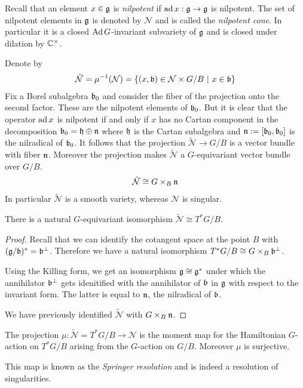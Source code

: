 \documentclass[12pt]{article}
\begin{document}
Recall that an element $x\in \mathfrak{g}$ is \emph{nilpotent} if $\operatorname{ad} x: \mathfrak{g} \to \mathfrak{g}$ is nilpotent. The set of nilpotent elements in $\mathfrak{g}$ is denoted by $\mathcal{N}$ and is called the \emph{nilpotent cone}. In particular it is a closed $\operatorname{Ad} G$-invariant subvariety of $\mathfrak{g}$ and is closed under dilation by $\mathbb{C}^\times$.

Denote by \begin{align*}
     \tilde{\mathcal{N}} = \mu^{-1}(\mathcal{N}) = \{(x,\mathfrak{b}) \in \mathcal{N} \times G/B \ \vert \  x\in \mathfrak{b}\}
\end{align*} Fix a Borel subalgebra $\mathfrak{b}_0$ and consider the fiber of the projection onto the second factor. These are the nilpotent elements of $\mathfrak{b}_0$. But it is clear that the operator $\operatorname{ad} x$ is nilpotent if and only if $x$ has no Cartan component in the decomposition $\mathfrak{b}_0 = \mathfrak{h} \oplus \mathfrak{n}$ where $\mathfrak{h}$ is the Cartan subalgebra and $\mathfrak{n} := [\mathfrak{b}_0,\mathfrak{b}_0]$ is the nilradical of $\mathfrak{b}_0$. It follows that the projection $\tilde{\mathcal{N}} \to G/B$ is a vector bundle with fiber $\mathfrak{n}$. Moreover the projection makes $\tilde{\mathcal{N}}$ a $G$-equivariant vector bundle over $G/B$. \begin{align*}
    \tilde{\mathcal{N}} \cong G \times_B \mathfrak{n}
\end{align*} In particular $\tilde{\mathcal{N}}$ is a smooth variety, whereas $\mathcal{N}$ is singular.

\begin{claim}
    There is a natural $G$-equivariant isomorphism $\tilde{\mathcal{N}} \cong T^*G/B$. 
\end{claim}

\begin{proof}

Recall that we can identify the cotangent space at the point $B$ with $(\mathfrak{g}/\mathfrak{b})^* = \mathfrak{b}^\perp$. Therefore we have a natural isomorphism $T^*G/B \cong G\times_B \mathfrak{b}^\perp$.

Using the Killing form, we get an isomorphism $\mathfrak{g} \cong \mathfrak{g}^*$ under which the annihilator $\mathfrak{b}^\perp$ gets idenitified with the annihilator of $\mathfrak{b}$ in $\mathfrak{g}$ with respect to the invariant form. The latter is equal to $\mathfrak{n}$, the nilradical of $\mathfrak{b}$. 

We have previously identified $\tilde{\mathcal{N}}$ with $G\times_B \mathfrak{n}$. 
\end{proof}

\begin{proposition}
    The projection $\mu: \tilde{\mathcal{N}} = T^*G/B \to \mathcal{N}$ is the moment map for the Hamiltonian $G$-action on $T^*G/B$ arising from the $G$-action on $G/B$. Moreover $\mu$ is surjective.
\end{proposition}
This map is known as the \emph{Springer resolution} and is indeed a resolution of singularities.
\end{document}
